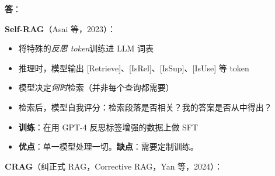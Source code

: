 \begin{questionbox}
\textbf{答}：

\textbf{Self-RAG}（Asai 等，2023）：

\begin{itemize}
  \item 将特殊的\emph{反思 token}训练进 LLM 词表
  \item 推理时，模型输出 [Retrieve]、[IsRel]、[IsSup]、[IsUse] 等 token
  \item 模型决定\emph{何时}检索（并非每个查询都需要）
  \item 检索后，模型自我评分：检索段落是否相关？我的答案是否从中得出？
  \item \textbf{训练}：在用 GPT-4 反思标签增强的数据上做 SFT
  \item \textbf{优点}：单一模型处理一切。\textbf{缺点}：需要定制训练。
\end{itemize}

\textbf{CRAG}（纠正式 RAG，Corrective RAG，Yan 等，2024）：


\end{questionbox}
